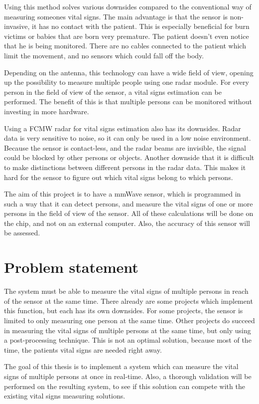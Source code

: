 Using this method solves various downsides compared to the conventional way of measuring someones vital signs. The main advantage is that the sensor is non-invasive, it has no contact with the patient. This is especially beneficial for burn victims or babies that are born very premature. The patient doesn't even notice that he is being monitored. There are no cables connected to the patient which limit the movement, and no sensors which could fall off the body. 

Depending on the antenna, this technology can have a wide field of view, opening up the possibility to measure multiple people using one radar module. For every person in the field of view of the sensor, a vital signs estimation can be performed. The benefit of this is that multiple persons can be monitored without investing in more hardware.

Using a FCMW radar for vital signs estimation also has its downsides. Radar data is very sensitive to noise, so it can only be used in a low noise environment. Because the sensor is contact-less, and the radar beams are invisible, the signal could be blocked by other persons or objects. Another downside that it is difficult to make distinctions between different persons in the radar data. This makes it hard for the sensor to figure out which vital signs belong to which persons.

The aim of this project is to have a mmWave sensor, which is programmed in such a way that it can detect persons, and measure the vital signs of one or more persons in the field of view of the sensor. All of these calculations will be done on the chip, and not on an external computer. Also, the accuracy of this sensor will be assessed.

\section{Problem statement}
\label{sec:problem_statement}
The system must be able to measure the vital signs of multiple persons in reach of the sensor at the same time. There already are some projects which implement this function, but each has its own downsides. For some projects, the sensor is limited to only measuring one person at the same time. Other projects do succeed in measuring the vital signs of multiple persons at the same time, but only using a post-processing technique. This is not an optimal solution, because most of the time, the patients vital signs are needed right away. 

The goal of this thesis is to implement a system which can measure the vital signs of multiple persons at once in real-time. Also, a thorough validation will be performed on the resulting system, to see if this solution can compete with the existing vital signs measuring solutions.

